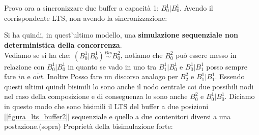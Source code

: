 Provo ora a sincronizzare due buffer a capacità 1: $B_0^1|B_0^1$. Avendo il corrispondente LTS, non avendo la sincronizzazione:
\begin{center}
\end{center}
Si ha quindi, in quest'ultimo modello, una \textbf{simulazione sequenziale non deterministica della concorrenza}.\\ Vediamo se si ha che: $(B_0^1|B_0^1)\stackrel{Bis}{\sim}B_0^2$, notiamo che $B_0^2$ può essere messo in relazione con $B_0^1|B_0^1$ in quanto se vado in uno tra $B_1^1|B_0^1$ e $B_0^1|B_1^1$ posso sempre fare $in $ e $\overline{out}$. Inoltre Posso fare un discorso analogo per $B_2^2$ e $B_1^1|B_1^1$. Essendo questi ultimi quindi bisimili lo sono anche il nodo centrale coi due possibili nodi nel caso della composizione e di conseguenza lo sono anche $B_0^2$ e $B_0^1|B_0^1$. Diciamo in questo modo che sono bisimili il LTS del buffer a due posizioni [\ref{figura_lts_buffer2}] sequenziale e quello a due contenitori diversi a una postazione.(sopra)
Proprietà della bisimulazione forte:
